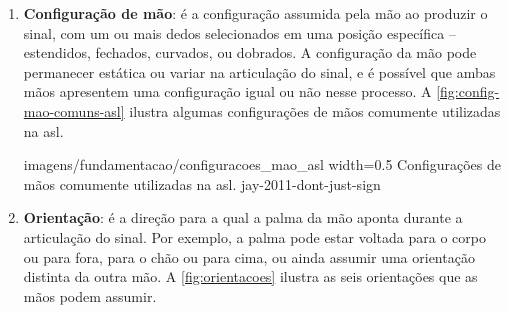 \begin{enumerate}
   \item \textbf{Configuração de mão}: é a configuração assumida pela mão ao produzir o sinal, com um ou mais dedos selecionados em uma posição específica -- estendidos, fechados, curvados, ou dobrados. A configuração da mão pode permanecer estática ou variar na articulação do sinal, e é possível que ambas mãos apresentem uma configuração igual ou não nesse processo. A \autoref{fig:config-mao-comuns-asl} ilustra algumas configurações de mãos comumente utilizadas na \acrshort{asl}.
   
        {imagens/fundamentacao/configuracoes_mao_asl} %
        {width=0.5\linewidth} %
        {Configurações de mãos comumente utilizadas na \acrshort{asl}.} %
        {jay-2011-dont-just-sign} %







    \item \textbf{Orientação}: é a direção para a qual a palma da mão aponta durante a articulação do sinal. Por exemplo, a palma pode estar voltada para o corpo ou para fora, para o chão ou para cima, ou ainda assumir uma orientação distinta da outra mão. A \autoref{fig:orientacoes} ilustra as seis orientações que as mãos podem assumir.
    

\end{enumerate}
